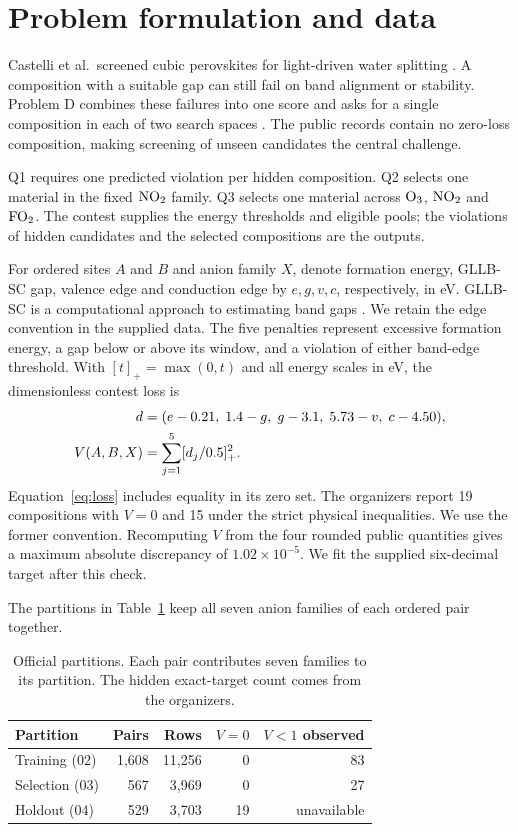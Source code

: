 \section{Problem formulation and data}
Castelli et al.\ screened cubic perovskites for light-driven water splitting \cite{castelli}. A composition with a suitable gap can still fail on band alignment or stability. Problem D combines these failures into one score and asks for a single composition in each of two search spaces \cite{contest}. The public records contain no zero-loss composition, making screening of unseen candidates the central challenge.

Q1 requires one predicted violation per hidden composition. Q2 selects one material in the fixed $\mathrm{NO}_2$ family. Q3 selects one material across $\mathrm O_3$, $\mathrm{NO}_2$ and $\mathrm{FO}_2$. The contest supplies the energy thresholds and eligible pools; the violations of hidden candidates and the selected compositions are the outputs.

For ordered sites $A$ and $B$ and anion family $X$, denote formation energy, GLLB-SC gap, valence edge and conduction edge by $e,g,v,c$, respectively, in eV. GLLB-SC is a computational approach to estimating band gaps \cite{kuisma}. We retain the edge convention in the supplied data. The five penalties represent excessive formation energy, a gap below or above its window, and a violation of either band-edge threshold. With $[t]_+=\max(0,t)$ and all energy scales in eV, the dimensionless contest loss is
\begin{align}
 d&=(e-0.21,\;1.4-g,\;g-3.1,\;5.73-v,\;c-4.50),\notag\\
 V(A,B,X)&=\sum_{j=1}^5 [d_j/0.5]_+^2. \label{eq:loss}
\end{align}
Equation~\eqref{eq:loss} includes equality in its zero set. The organizers report 19 compositions with $V=0$ and 15 under the strict physical inequalities. We use the former convention. Recomputing $V$ from the four rounded public quantities gives a maximum absolute discrepancy of $1.02\times10^{-5}$. We fit the supplied six-decimal target after this check.

The partitions in Table~\ref{tab:data} keep all seven anion families of each ordered pair together.

\begin{table}[htbp]
\caption{Official partitions. Each pair contributes seven families to its partition. The hidden exact-target count comes from the organizers.}\label{tab:data}
\centering\begin{tabular}{lrrrr}
\toprule Partition & Pairs & Rows & $V=0$ & $V<1$ observed\\\midrule
Training (02) & 1,608 & 11,256 & 0 & 83\\
Selection (03) & 567 & 3,969 & 0 & 27\\
Holdout (04) & 529 & 3,703 & 19 & unavailable\\\bottomrule
\end{tabular}
\end{table}

